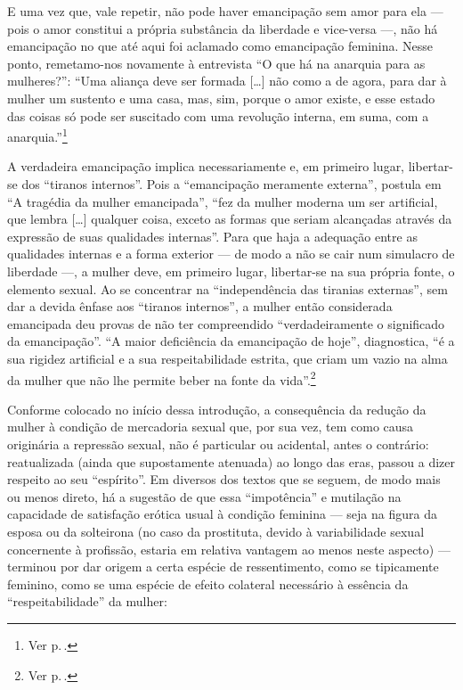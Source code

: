 E uma vez que, vale repetir, não pode haver emancipação sem amor para ela
--- pois o amor constitui a própria substância da liberdade e
vice-versa ---, não há emancipação no que até aqui foi aclamado como
emancipação feminina. Nesse ponto, remetamo-nos novamente à entrevista
``O que há na anarquia para as mulheres?'': ``Uma aliança
deve ser formada {[}\ldots{]} não como a de agora, para dar à mulher um
sustento e uma casa, mas, sim, porque o amor existe, e esse estado das
coisas só pode ser suscitado com uma revolução interna, em suma, com a
anarquia.''\footnote{Ver p.\,\pageref{alianca}.}

A verdadeira emancipação implica necessariamente e, em primeiro lugar,
libertar-se dos ``tiranos internos''. Pois a ``emancipação meramente
externa'', postula em ``A tragédia da mulher emancipada'', ``fez da
mulher moderna um ser artificial, que lembra {[}\ldots{]} qualquer coisa,
exceto as formas que seriam alcançadas através da expressão de suas
qualidades internas''. Para que haja a adequação entre as qualidades
internas e a forma exterior --- de modo a não se cair num simulacro de
liberdade ---, a mulher deve, em primeiro lugar, libertar-se na sua
própria fonte, o elemento sexual. Ao se concentrar na ``independência
das tiranias externas'', sem dar a devida ênfase aos ``tiranos
internos'', a mulher então considerada emancipada deu
provas de não ter compreendido ``verdadeiramente o significado da
emancipação''. ``A maior deficiência da emancipação de hoje'',
diagnostica, ``é a sua rigidez artificial e a sua respeitabilidade
estrita, que criam um vazio na alma da mulher que não lhe permite beber
na fonte da vida''.\footnote{Ver p.\,\pageref{mae}.}

Conforme colocado no início dessa introdução, a consequência da
redução da mulher à condição de mercadoria sexual que, por sua vez, tem
como causa originária a repressão sexual, não é particular ou acidental,
antes o contrário: reatualizada (ainda que supostamente atenuada) ao
longo das eras, passou a dizer respeito ao seu ``espírito''. Em diversos
dos textos que se seguem, de modo mais ou menos direto, há a sugestão de
que essa ``impotência'' e mutilação na capacidade de satisfação erótica
usual à condição feminina --- seja na figura da esposa ou da solteirona
(no caso da prostituta, devido à variabilidade sexual concernente à
profissão, estaria em relativa vantagem ao menos neste aspecto) ---
terminou por dar origem a certa espécie de ressentimento, como se
tipicamente feminino, como se uma espécie de efeito colateral necessário
à essência da ``respeitabilidade'' da mulher:

